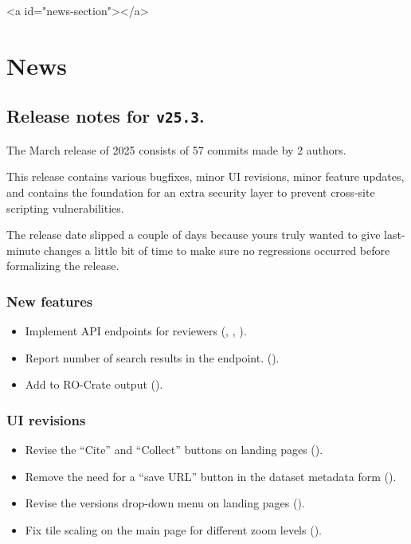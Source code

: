 \ifdefined\HCode
\begin{html}
<a id="news-section"></a>
\end{html}
\fi
\chapter*{News}

\section*{Release notes for \texttt{v25.3}.}

  The March release of 2025 consists of 57 commits made by 2 authors.

  This release contains various bugfixes, minor UI revisions, minor feature
  updates, and contains the foundation for an extra security layer to prevent
  cross-site scripting vulnerabilities.

  The release date slipped a couple of days because yours truly wanted to
  give last-minute changes a little bit of time to make sure no regressions
  occurred before formalizing the release.

\subsection*{New features}
\begin{itemize}
\item{Implement API endpoints for reviewers
    (,
    ,
    ).}
\item{Report number of search results in the  endpoint.
    ().}
\item{Add  to RO-Crate output
    ().}
\end{itemize}

\subsection*{UI revisions}
\begin{itemize}
\item{Revise the ``Cite'' and ``Collect'' buttons on landing pages
    ().}
\item{Remove the need for a ``save URL'' button in the dataset metadata form
    ().}
\item{Revise the versions drop-down menu on landing pages
    ().}
\item{Fix tile scaling on the main page for different zoom levels
    ().}
\end{itemize}
